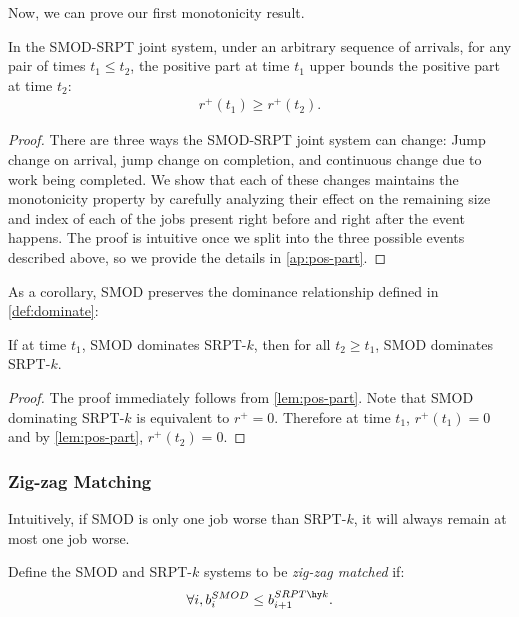 \documentclass[acmsmall]{acmart}
\begin{document}
Now, we can prove our first monotonicity result.
\begin{lemma}
\label{lem:pos-part}
    In the SMOD-SRPT joint system,
    under an arbitrary sequence of arrivals,
    for any pair of times $t_1 \le t_2$,
    the positive part at time $t_1$ upper bounds the positive part at time $t_2$:
    \begin{align*}
        r^+(t_1) \ge r^+(t_2).
    \end{align*}
\end{lemma}
\begin{proof}
    There are three ways the SMOD-SRPT joint system can change:
    Jump change on arrival, jump change on completion, and continuous change due to work being completed.
    We show that each of these changes maintains the monotonicity property by carefully analyzing their effect on the remaining size and index of each of the jobs present right before and right after the event happens. The proof is intuitive once we split into the three possible events described above, so we provide the details in \cref{ap:pos-part}.
\end{proof}

As a corollary, SMOD preserves the dominance relationship defined in \cref{def:dominate}:
\begin{corollary}
    \label{cor:dominance}
    If at time $t_1$, SMOD dominates SRPT-$k$, then for all $t_2 \ge t_1$,
    SMOD dominates SRPT-$k$.
\end{corollary}
\begin{proof}
    The proof immediately follows from \cref{lem:pos-part}.
    Note that SMOD dominating SRPT-$k$ is equivalent to $r^+ = 0$.
    Therefore at time $t_1$, $r^+(t_1) = 0$ and by \cref{lem:pos-part}, $r^+(t_2) = 0$.
\end{proof}

\subsubsection{Zig-zag Matching}
\label{sec:zig-zag}

Intuitively, if SMOD is only one job worse than SRPT-$k$, it will always remain at most one job worse. 

\begin{definition} 
    \label{def:zig-zag}
Define the SMOD and SRPT-$k$ systems to be \emph{zig-zag matched} if:
\begin{align*}
    \forall i, b_i^{SMOD} \le b_{i+1}^{SRPT\hy k}.
\end{align*}
\end{definition}
\end{document}
